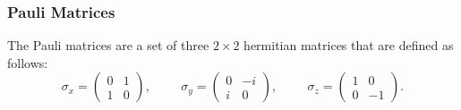 \subsubsection{Pauli Matrices}
\begin{definition}
The Pauli matrices are a set of three $2 \times 2$ hermitian matrices that are defined as follows:
\begin{equation*}
  \sigma_{x} = \begin{pmatrix} 0 & 1\\ 1 & 0 \end{pmatrix}, \hspace{1cm} \sigma_{y} = \begin{pmatrix} 0 & -i\\ i & 0 \end{pmatrix}, \hspace{1cm} \sigma_{z} = \begin{pmatrix} 1 & 0\\ 0 & -1 \end{pmatrix}.
\end{equation*}
\end{definition}

